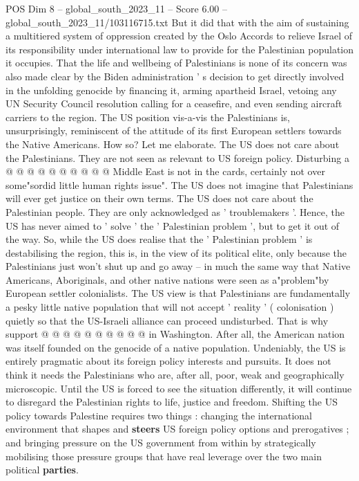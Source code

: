\begin{textsample}{POS Dim 8 – global\_south\_2023\_11 – Score 6.00 – global\_south\_2023\_11/103116715.txt}
But it did that with the aim of sustaining a multitiered system of oppression created by the Oslo Accords to relieve Israel of its responsibility under international law to provide for the Palestinian population it occupies.
That the life and wellbeing of Palestinians is none of its concern was also made clear by the Biden administration ' s decision to get directly involved in the unfolding genocide by financing it, arming apartheid Israel, vetoing any UN Security Council resolution calling for a ceasefire, and even sending aircraft carriers to the region.
The US position vis-a-vis the Palestinians is, unsurprisingly, reminiscent of the attitude of its first European settlers towards the Native Americans.
How so?
Let me elaborate.
The US does not care about the Palestinians.
They are not seen as relevant to US foreign policy.
Disturbing a @ @ @ @ @ @ @ @ @ @ Middle East is not in the cards, certainly not over some"sordid little human rights issue".
The US does not imagine that Palestinians will ever get justice on their own terms.
The US does not care about the Palestinian people.
They are only acknowledged as ' troublemakers '.
Hence, the US has never aimed to ' solve ' the ' Palestinian problem ', but to get it out of the way.
So, while the US does realise that the ' Palestinian problem ' is destabilising the region, this is, in the view of its political elite, only because the Palestinians just won't shut up and go away -- in much the same way that Native Americans, Aboriginals, and other native nations were seen as a"problem"by European settler colonialists.
The US view is that Palestinians are fundamentally a pesky little native population that will not accept ' reality ' ( colonisation ) quietly so that the US-Israeli alliance can proceed undisturbed.
That is why support @ @ @ @ @ @ @ @ @ @ in Washington.
After all, the American nation was itself founded on the genocide of a native population.
Undeniably, the US is entirely pragmatic about its foreign policy interests and pursuits.
It does not think it needs the Palestinians who are, after all, poor, weak and geographically microscopic.
Until the US is forced to see the situation differently, it will continue to disregard the Palestinian rights to life, justice and freedom.
Shifting the US policy towards Palestine requires two things : changing the international environment that shapes and \textbf{steers} US foreign policy options and prerogatives ; and bringing pressure on the US government from within by strategically mobilising those pressure groups that have real leverage over the two main political \textbf{parties}.

\end{textsample}
